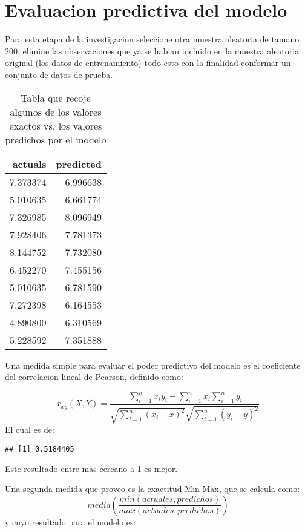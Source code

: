 \documentclass[]{book}
\begin{document}
\chapter{Evaluacion predictiva del
modelo}\label{evaluacion-predictiva-del-modelo}

Para esta etapa de la investigacion seleccione otra muestra aleatoria de
tamano 200, elimine las observaciones que ya se habian incluido en la
muestra aleatoria original (los datos de entrenamiento) todo esto con la
finalidad conformar un conjunto de datos de prueba.

\begin{table}

\caption{\label{tab:unnamed-chunk-46}Tabla que recoje algunos de los valores exactos vs. los valores predichos por el modelo}
\centering
\begin{tabular}[t]{r|r}
\hline
actuals & predicted\\
\hline
7.373374 & 6.996638\\
\hline
5.010635 & 6.661774\\
\hline
7.326985 & 8.096949\\
\hline
7.928406 & 7.781373\\
\hline
8.144752 & 7.732080\\
\hline
6.452270 & 7.455156\\
\hline
5.010635 & 6.781590\\
\hline
7.272398 & 6.164553\\
\hline
4.890800 & 6.310569\\
\hline
5.228592 & 7.351888\\
\hline
\end{tabular}
\end{table}

Una medida simple para evaluar el poder predictivo del modelo es el
coeficiente del correlacion lineal de Pearson, definido como:

\[ \ r_{xy}(X,Y) =\frac{\ \sum_{i=1}^{n}x_{i}y_{i} - \sum_{i = 1}^{n}x_{i} \sum_{i = 1}^{n}y_{i}} {\sqrt{\sum_{i = 1}^{n}(x_{i}- \bar{x})^{2}}\sqrt{\sum_{i = 1}^{n}(y_{i}- \bar{y})^{2}}} \]
El cual es de:

\begin{verbatim}
## [1] 0.5184405
\end{verbatim}

Este resultado entre mas cercano a 1 es mejor.

Una segunda medida que proveo es la exactitud Min-Max, que se calcula
como:
\[ \ media(\frac{min(actuales,predichos)}{max(actuales,predichos)}) \] y
cuyo resultado para el modelo es:
\end{document}
